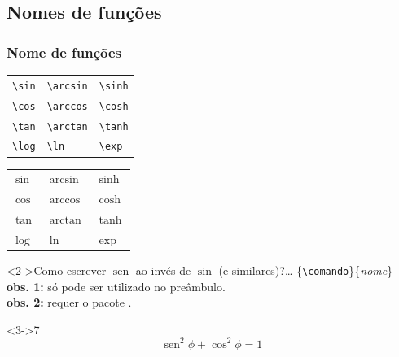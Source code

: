 \documentclass[handout,10pt]{beamer}
\DeclareMathOperator{\sen}{sen}
\begin{document}
\subsection{Nomes de funções}
\begin{frame}[fragile]
	\frametitle{Nome de funções}
		
	\begin{tabular}{lll}
		\verb|\sin| & \verb|\arcsin| & \verb|\sinh| \\
		\verb|\cos| & \verb|\arccos| & \verb|\cosh| \\
		\verb|\tan| & \verb|\arctan| & \verb|\tanh| \\
		\verb|\log| & \verb|\ln|     & \verb|\exp|
	\end{tabular}\hfill
	\begin{tabular}{lll}
		$\sin$ & $\arcsin$ & $\sinh$ \\
		$\cos$ & $\arccos$ & $\cosh$ \\
		$\tan$ & $\arctan$ & $\tanh$ \\
		$\log$ & $\ln$     & $\exp$
	\end{tabular}
	
	
	\begin{block}<2->{Como escrever $\sen$ ao invés de $\sin$ (e similares)?\dots}
		\{\verb|\comando|\}\{\textit{nome}\}\\[0.5cm]
		
		\footnotesize
		\textbf{obs. 1:} só pode ser utilizado no preâmbulo.\\
		\textbf{obs. 2:} requer o pacote .
	\end{block}
	
	
	\begin{atividade}<3->{7}	
		\[\sen^2\phi + \cos^2\phi = 1\]
	\end{atividade}		
\end{frame}
\end{document}
